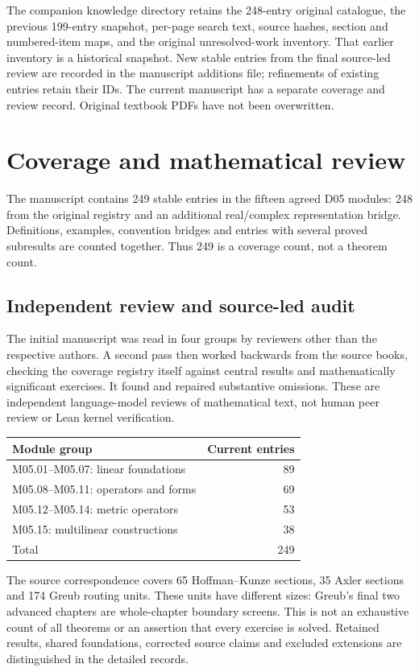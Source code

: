 \documentclass[11pt,a4paper]{book}
\theoremstyle{definition}\newtheorem{definition}[theorem]{Definition}
\theoremstyle{remark}\newtheorem{remark}[theorem]{Remark}
\begin{document}
The companion knowledge directory retains the 248-entry original catalogue, the previous 199-entry snapshot, per-page search text, source hashes, section and numbered-item maps, and the original unresolved-work inventory. That earlier inventory is a historical snapshot. New stable entries from the final source-led review are recorded in the manuscript additions file; refinements of existing entries retain their IDs. The current manuscript has a separate coverage and review record. Original textbook PDFs have not been overwritten.



\chapter{Coverage and mathematical review}
The manuscript contains 249 stable entries in the fifteen agreed D05 modules: 248 from the original registry and an additional real/complex representation bridge. Definitions, examples, convention bridges and entries with several proved subresults are counted together. Thus 249 is a coverage count, not a theorem count.

\section*{Independent review and source-led audit}
The initial manuscript was read in four groups by reviewers other than the respective authors. A second pass then worked backwards from the source books, checking the coverage registry itself against central results and mathematically significant exercises. It found and repaired substantive omissions. These are independent language-model reviews of mathematical text, not human peer review or Lean kernel verification.

\begin{center}
\begin{tabular}{lr}
\toprule
Module group & Current entries\\
\midrule
M05.01--M05.07: linear foundations & 89\\
M05.08--M05.11: operators and forms & 69\\
M05.12--M05.14: metric operators & 53\\
M05.15: multilinear constructions & 38\\
\midrule
Total & 249\\
\bottomrule
\end{tabular}
\end{center}
The source correspondence covers 65 Hoffman--Kunze sections, 35 Axler sections and 174 Greub routing units. These units have different sizes: Greub's final two advanced chapters are whole-chapter boundary screens. This is not an exhaustive count of all theorems or an assertion that every exercise is solved. Retained results, shared foundations, corrected source claims and excluded extensions are distinguished in the detailed records.
\end{document}
